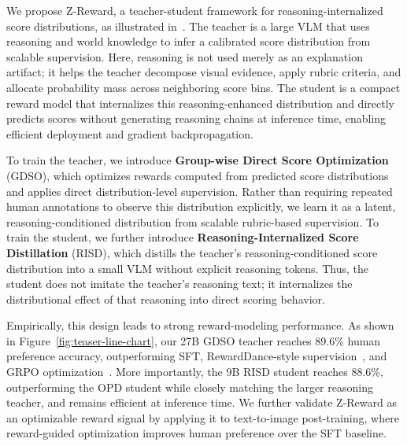 \documentclass{article}
\newcommand{\mname}{Z-Reward\xspace}
\newcommand{\teaname}{GDSO\xspace}
\newcommand{\stuname}{RISD\xspace}
\begin{document}
We propose \mname, a teacher-student framework for reasoning-internalized score distributions, as illustrated in~. The teacher is a large VLM that uses reasoning and world knowledge to infer a calibrated score distribution from scalable supervision. Here, reasoning is not used merely as an explanation artifact; it helps the teacher decompose visual evidence, apply rubric criteria, and allocate probability mass across neighboring score bins. The student is a compact reward model that internalizes this reasoning-enhanced distribution and directly predicts scores without generating reasoning chains at inference time, enabling efficient deployment and gradient backpropagation.

To train the teacher, we introduce \textbf{Group-wise Direct Score Optimization} (\teaname), which optimizes rewards computed from predicted score distributions and applies direct distribution-level supervision. Rather than requiring repeated human annotations to observe this distribution explicitly, we learn it as a latent, reasoning-conditioned distribution from scalable rubric-based supervision. To train the student, we further introduce \textbf{Reasoning-Internalized Score Distillation} (\stuname), which distills the teacher's  reasoning-conditioned score distribution into a small VLM without explicit reasoning tokens. Thus, the student does not imitate the teacher's reasoning text; it internalizes the distributional effect of that reasoning into direct scoring behavior. %

Empirically, this design leads to strong reward-modeling performance. As shown in Figure~\ref{fig:teaser-line-chart}, our 27B GDSO teacher reaches 89.6\% human preference accuracy, outperforming SFT, RewardDance-style supervision~\cite{wu2025rewarddancerewardscalingvisual}, and GRPO optimization~\cite{deepseek-math}.
More importantly, the 9B \stuname student reaches 88.6\%, outperforming the OPD student while closely matching the larger reasoning teacher, and remains efficient at inference time.
We further validate \mname as an optimizable reward signal by applying it to text-to-image post-training, where reward-guided optimization improves human preference over the SFT baseline.
\end{document}
